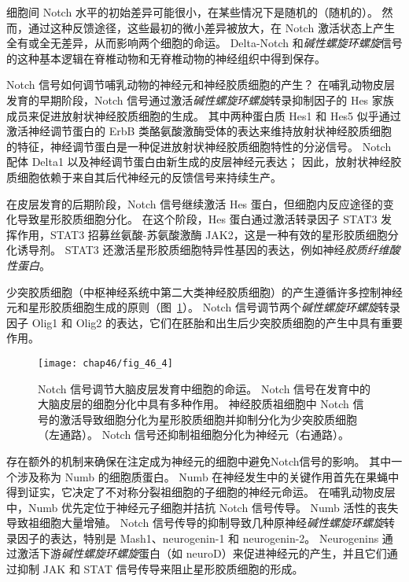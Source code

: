 细胞间 Notch 水平的初始差异可能很小，在某些情况下是随机的（随机的）。
然而，通过这种反馈途径，这些最初的微小差异被放大，在 Notch 激活状态上产生全有或全无差异，从而影响两个细胞的命运。
Delta-Notch 和\textit{碱性螺旋环螺旋}信号的这种基本逻辑在脊椎动物和无脊椎动物的神经组织中得到保存。


Notch 信号如何调节哺乳动物的神经元和神经胶质细胞的产生？
在哺乳动物皮层发育的早期阶段，Notch 信号通过激活\textit{碱性螺旋环螺旋}转录抑制因子的 Hes 家族成员来促进放射状神经胶质细胞的生成。
其中两种蛋白质 Hes1 和 Hes5 似乎通过激活神经调节蛋白的 ErbB 类酪氨酸激酶受体的表达来维持放射状神经胶质细胞的特征，神经调节蛋白是一种促进放射状神经胶质细胞特性的分泌信号。
Notch 配体 Delta1 以及神经调节蛋白由新生成的皮层神经元表达；
因此，放射状神经胶质细胞依赖于来自其后代神经元的反馈信号来持续生产。


在皮层发育的后期阶段，Notch 信号继续激活 Hes 蛋白，但细胞内反应途径的变化导致星形胶质细胞分化。
在这个阶段，Hes 蛋白通过激活转录因子 STAT3 发挥作用，STAT3 招募丝氨酸-苏氨酸激酶 JAK2，这是一种有效的星形胶质细胞分化诱导剂。
STAT3 还激活星形胶质细胞特异性基因的表达，例如神经\textit{胶质纤维酸性蛋白}。


少突胶质细胞（中枢神经系统中第二大类神经胶质细胞）的产生遵循许多控制神经元和星形胶质细胞生成的原则（图~\ref{fig:46_4}）。
Notch 信号调节两个\textit{碱性螺旋环螺旋}转录因子 Olig1 和 Olig2 的表达，它们在胚胎和出生后少突胶质细胞的产生中具有重要作用。


\begin{figure}[htbp]
	\centering
	\texttt{[image: chap46/fig\_46\_4]}
	\caption{Notch 信号调节大脑皮层发育中细胞的命运。
		Notch 信号在发育中的大脑皮层的细胞分化中具有多种作用。
		神经胶质祖细胞中 Notch 信号的激活导致细胞分化为星形胶质细胞并抑制分化为少突胶质细胞（左通路）。
		Notch 信号还抑制祖细胞分化为神经元（右通路）。}
	\label{fig:46_4}
\end{figure}


存在额外的机制来确保在注定成为神经元的细胞中避免Notch信号的影响。
其中一个涉及称为 Numb 的细胞质蛋白。
Numb 在神经发生中的关键作用首先在果蝇中得到证实，它决定了不对称分裂祖细胞的子细胞的神经元命运。
在哺乳动物皮层中，Numb 优先定位于神经元子细胞并拮抗 Notch 信号传导。
Numb 活性的丧失导致祖细胞大量增殖。
Notch 信号传导的抑制导致几种原神经\textit{碱性螺旋环螺旋}转录因子的表达，特别是 Mash1、neurogenin-1 和 neurogenin-2。
Neurogenins 通过激活下游\textit{碱性螺旋环螺旋}蛋白（如 neuroD）来促进神经元的产生，并且它们通过抑制 JAK 和 STAT 信号传导来阻止星形胶质细胞的形成。


